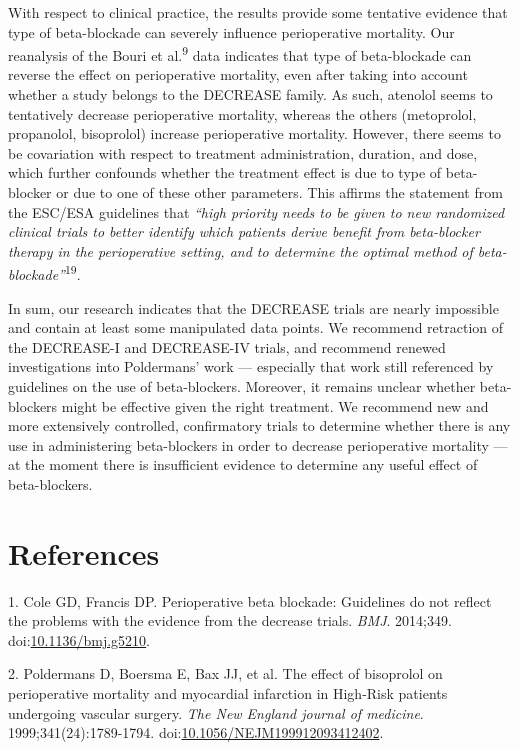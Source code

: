 \documentclass[]{article}
\begin{document}
With respect to clinical practice, the results provide some tentative
evidence that type of beta-blockade can severely influence perioperative
mortality. Our reanalysis of the Bouri et al.\textsuperscript{9} data
indicates that type of beta-blockade can reverse the effect on
perioperative mortality, even after taking into account whether a study
belongs to the DECREASE family. As such, atenolol seems to tentatively
decrease perioperative mortality, whereas the others (metoprolol,
propanolol, bisoprolol) increase perioperative mortality. However, there
seems to be covariation with respect to treatment administration,
duration, and dose, which further confounds whether the treatment effect
is due to type of beta-blocker or due to one of these other parameters.
This affirms the statement from the ESC/ESA guidelines that \emph{``high
priority needs to be given to new randomized clinical trials to better
identify which patients derive benefit from beta-blocker therapy in the
perioperative setting, and to determine the optimal method of
beta-blockade''}\textsuperscript{19}.

In sum, our research indicates that the DECREASE trials are nearly
impossible and contain at least some manipulated data points. We
recommend retraction of the DECREASE-I and DECREASE-IV trials, and
recommend renewed investigations into Poldermans' work --- especially
that work still referenced by guidelines on the use of beta-blockers.
Moreover, it remains unclear whether beta-blockers might be effective
given the right treatment. We recommend new and more extensively
controlled, confirmatory trials to determine whether there is any use in
administering beta-blockers in order to decrease perioperative mortality
--- at the moment there is insufficient evidence to determine any useful
effect of beta-blockers.

\section*{References}\label{references}

\hypertarget{refs}{}
\hypertarget{ref-Coleg5210}{}
1. Cole GD, Francis DP. Perioperative beta blockade: Guidelines do not
reflect the problems with the evidence from the decrease trials.
\emph{BMJ}. 2014;349.
doi:\href{https://doi.org/10.1136/bmj.g5210}{10.1136/bmj.g5210}.

\hypertarget{ref-poldermans1999}{}
2. Poldermans D, Boersma E, Bax JJ, et al. The effect of bisoprolol on
perioperative mortality and myocardial infarction in High-Risk patients
undergoing vascular surgery. \emph{The New England journal of medicine}.
1999;341(24):1789-1794.
doi:\href{https://doi.org/10.1056/NEJM199912093412402}{10.1056/NEJM199912093412402}.
\end{document}
